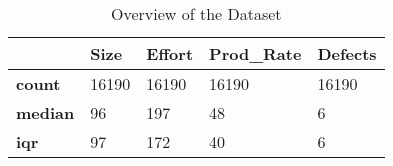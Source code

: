 \begin{table}
\centering
\caption{Overview of the Dataset}
\label{tab:overview}
\begin{tabular}{|l|l|l|l|l|}
\hline
\textbf{}       & \textbf{Size} & \textbf{Effort} & \textbf{Prod\_Rate} & \textbf{Defects} \\ \hline
\textbf{count}  & 16190       & 16190         & 16190             & 16190          \\ \hline
\textbf{median} & 96          & 197           & 48                & 6              \\ \hline
\textbf{iqr}    & 97          & 172           & 40                & 6             \\ \hline
\end{tabular}
\end{table}